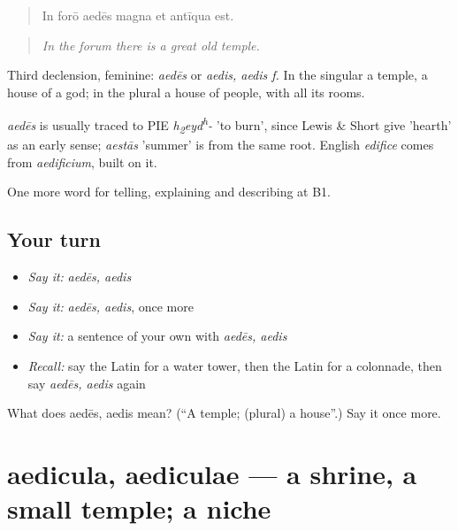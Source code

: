 \begin{quote}
In forō aedēs magna et antīqua est.
\end{quote}

\begin{quote}
\emph{In the forum there is a great old temple.}
\end{quote}

Third declension, feminine: \emph{aedēs} or \emph{aedis, aedis f.} In the singular a temple, a house of a god; in the plural a house of people, with all its rooms.

\begin{cousinweb}
\emph{aedēs} is usually traced to PIE \emph{h\textsubscript{2}eyd\textsuperscript{h}-} 'to burn', since Lewis \& Short give 'hearth' as an early sense; \emph{aestās} 'summer' is from the same root. English \emph{edifice} comes from \emph{aedificium}, built on it.
\end{cousinweb}

\begin{grammarlens}[title={What you've built}]
One more word for telling, explaining and describing at B1.
\end{grammarlens}

\subsection*{Your turn}
\begin{itemize}
\raggedright
  \item \emph{Say it:} \emph{aedēs, aedis}
  \item \emph{Say it:} \emph{aedēs, aedis}, once more
  \item \emph{Say it:} a sentence of your own with \emph{aedēs, aedis}
  \item \emph{Recall:} say the Latin for a water tower, then the Latin for a colonnade, then say \emph{aedēs, aedis} again
\end{itemize}

\begin{tcolorbox}[breakable,colback=teal!4,colframe=teal!35!black,title={Before you move on}]
What does aedēs, aedis mean? (\textquotedblleft{}A temple; (plural) a house\textquotedblright{}.) Say it once more.
\end{tcolorbox}
\section[aedicula, aediculae]{aedicula, aediculae — a shrine, a small temple; a niche}

